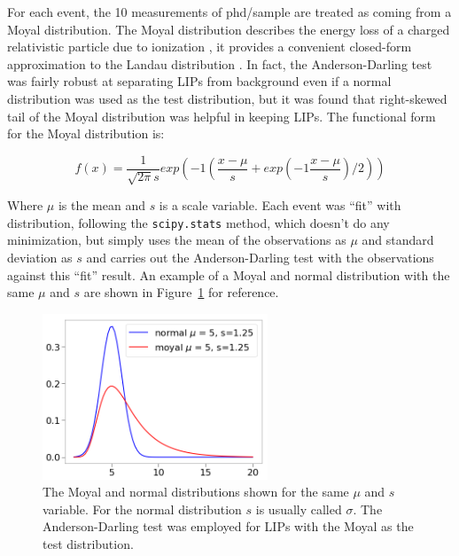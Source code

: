 For each event, the 10 measurements of phd/sample are treated as coming from a Moyal distribution. The Moyal distribution describes the energy loss of a charged relativistic particle due to ionization \cite{Moyal1955}, it provides a convenient closed-form approximation to the Landau distribution \cite{Cordeiro2012}. In fact, the Anderson-Darling test was fairly robust at separating \ac{LIP}s from background even if a normal distribution was used as the test distribution, but it was found that right-skewed tail of the Moyal distribution was helpful in keeping \ac{LIP}s. The functional form for the Moyal distribution is:

\begin{equation}
f(x) = \frac{1}{\sqrt{2 \pi}s}exp(-1 ( \frac{x-\mu}{s} + exp(-1\frac{x-\mu}{s} )/2))
\end{equation}

Where $\mu$ is the mean and $s$ is a scale variable. Each event was ``fit'' with distribution, following the \texttt{scipy.stats} method, which doesn't do any minimization, but simply uses the mean of the observations as $\mu$ and standard deviation as $s$ and carries out the Anderson-Darling test with the observations against this ``fit'' result. An example of a Moyal and normal distribution with the same $\mu$ and $s$ are shown in Figure~\ref{fig:pdfs} for reference.

\begin{figure}[htbp]
\begin{center}
\includegraphics[width=0.6\textwidth]{figures/lips/pdfs.png}
\caption{ The Moyal and normal distributions shown for the same $\mu$ and $s$ variable. For the normal distribution $s$ is usually called $\sigma$. The Anderson-Darling test was employed for \acs{LIP}s with the Moyal as the test distribution.  }
\label{fig:pdfs}
\end{center}
\end{figure}


